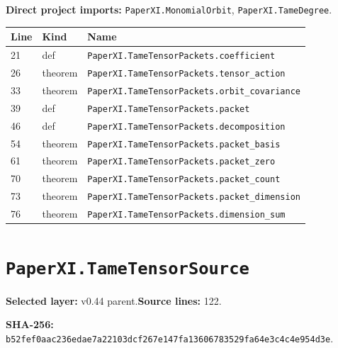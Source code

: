 \documentclass[10pt,oneside]{book}
\begin{document}

\textbf{Direct project imports:} \nolinkurl{PaperXI.MonomialOrbit}, \nolinkurl{PaperXI.TameDegree}.

\begin{longtable}{@{}p{}p{}p{}@{}}\toprule Line&Kind&Name\\\midrule\endhead

21&def&\nolinkurl{PaperXI.TameTensorPackets.coefficient}\\

26&theorem&\nolinkurl{PaperXI.TameTensorPackets.tensor_action}\\

33&theorem&\nolinkurl{PaperXI.TameTensorPackets.orbit_covariance}\\

39&def&\nolinkurl{PaperXI.TameTensorPackets.packet}\\

46&def&\nolinkurl{PaperXI.TameTensorPackets.decomposition}\\

54&theorem&\nolinkurl{PaperXI.TameTensorPackets.packet_basis}\\

61&theorem&\nolinkurl{PaperXI.TameTensorPackets.packet_zero}\\

70&theorem&\nolinkurl{PaperXI.TameTensorPackets.packet_count}\\

73&theorem&\nolinkurl{PaperXI.TameTensorPackets.packet_dimension}\\

76&theorem&\nolinkurl{PaperXI.TameTensorPackets.dimension_sum}\\

\bottomrule\end{longtable}

\section{\texorpdfstring{\nolinkurl{PaperXI.TameTensorSource}}{PaperXI.TameTensorSource}}\label{module:PaperXI.TameTensorSource}

\textbf{Selected layer:} v0.44 parent.\quad\textbf{Source lines:} 122.\par\textbf{SHA-256:} {\scriptsize\nolinkurl{b52fef0aac236edae7a22103dcf267e147fa13606783529fa64e3c4c4e954d3e}}.
\end{document}
